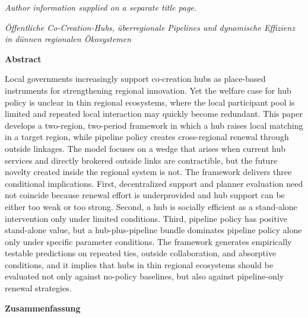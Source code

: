 \documentclass[12pt]{article}
\title{\papertitle}
\author{}
\date{}
\newif\ifblind
\theoremstyle{plain}
\theoremstyle{remark}
\newcommand{\papertitlede}{\"{O}ffentliche Co-Creation-Hubs, \"uberregionale Pipelines und dynamische Effizienz in d\"unnen regionalen \"Okosystemen}
\begin{document}
\maketitle
\thispagestyle{plain}

\ifblind
\begin{center}
\normalsize
\emph{Author information omitted for double-blind review.}
\end{center}
\vspace{0.6em}
\else
\begin{center}
\normalsize
\emph{Author information supplied on a separate title page.}
\end{center}
\vspace{0.6em}
\fi

\begin{center}
\normalsize
\textit{\papertitlede}
\end{center}
\vspace{0.6em}

\noindent\textbf{Abstract}

\noindent
Local governments increasingly support co-creation hubs as place-based instruments for strengthening regional innovation. Yet the welfare case for hub policy is unclear in thin regional ecosystems, where the local participant pool is limited and repeated local interaction may quickly become redundant. This paper develops a two-region, two-period framework in which a hub raises local matching in a target region, while pipeline policy creates cross-regional renewal through outside linkages. The model focuses on a wedge that arises when current hub services and directly brokered outside links are contractible, but the future novelty created inside the regional system is not. The framework delivers three conditional implications. First, decentralized support and planner evaluation need not coincide because renewal effort is underprovided and hub support can be either too weak or too strong. Second, a hub is socially efficient as a stand-alone intervention only under limited conditions. Third, pipeline policy has positive stand-alone value, but a hub-plus-pipeline bundle dominates pipeline policy alone only under specific parameter conditions. The framework generates empirically testable predictions on repeated ties, outside collaboration, and absorptive conditions, and it implies that hubs in thin regional ecosystems should be evaluated not only against no-policy baselines, but also against pipeline-only renewal strategies.

\vspace{0.8em}
\noindent\textbf{Zusammenfassung}
\end{document}
